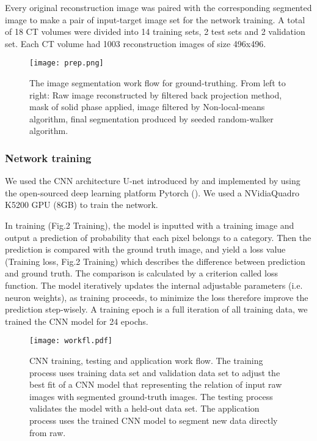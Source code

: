 \documentclass[draft,linenumbers]{agujournal2018}
\begin{document}
Every original reconstruction image was paired with the corresponding segmented image to make a pair of input-target image set for the network training. A total of 18 CT volumes were divided into 14 training sets, 2 test sets and 2 validation set. Each CT volume had 1003 reconstruction images of size 496x496.  

\begin{figure}[h]
\centering
\texttt{[image: prep.png]}
\caption{The image segmentation work flow for ground-truthing. From left to right: Raw image reconstructed by filtered back projection method, mask of solid phase applied, image filtered by Non-local-means algorithm, final segmentation produced by seeded random-walker algorithm.}
\label{fig1}
\end{figure}

\subsubsection{Network training}
We used the CNN architecture U-net introduced by \citet{ronneberger2015u} and implemented by \citet{Jorispytorch} using the open-sourced deep learning platform Pytorch (\citet{paszke2017automatic}). We used a NVidia\texttrademark Quadro K5200 GPU (8GB) to train the network. 

In training (Fig.2 Training), the model is inputted with a training image and output a prediction of probability that each pixel belongs to a category. Then the prediction is compared with the ground truth image, and yield a loss value (Training loss, Fig.2 Training) which describes the difference between prediction and ground truth. The comparison is calculated by a criterion called loss function. The model iteratively updates the internal adjustable parameters (i.e. neuron weights), as training proceeds, to minimize the loss therefore improve the prediction step-wisely. A training epoch is a full iteration of all training data, we trained the CNN model for 24 epochs.

\begin{figure}[h]
\centering
\texttt{[image: workfl.pdf]}
\caption{CNN training, testing and application work flow. The training process uses training data set and validation data set to adjust the best fit of a CNN model that representing the relation of input raw images with segmented ground-truth images. The testing process validates the model with a held-out data set. The application process uses the trained CNN model to segment new data directly from raw.}
\label{fig0}
\end{figure}
\end{document}
